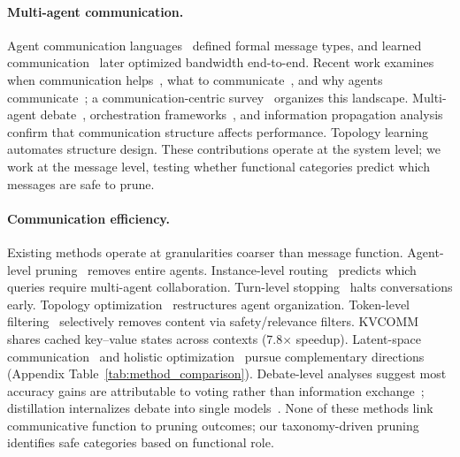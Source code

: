 \paragraph{Multi-agent communication.}
Agent communication languages~\citep{finin_kqml_1994} defined formal message types, and learned communication~\citep{sukhbaatar_commnet_2016, foerster_dial_2016} later optimized bandwidth end-to-end. Recent work examines when communication helps~\citep{rizvi_martel_communication_2026}, what to communicate~\citep{chen_five_ws_2026}, and why agents communicate~\citep{zhou_why_agents_communicate_2025}; a communication-centric survey~\citep{yan_beyond_self_talk_2025} organizes this landscape. Multi-agent debate~\citep{du_debate_2024}, orchestration frameworks~\citep{li_camel_2023, hong_metagpt_2024, wu_autogen_2024, chen_agentverse_2024, wang_megaagent_2025}, and information propagation analysis~\citep{shen_eib_2025} confirm that communication structure affects performance. Topology learning~\citep{li_arg_designer_2026, lu_dytopo_2026} automates structure design. These contributions operate at the system level; we work at the message level, testing whether functional categories predict which messages are safe to prune.

\paragraph{Communication efficiency.}
Existing methods operate at granularities coarser than message function. Agent-level pruning~\citep{wang_agentdropout_2025, wang_agentdropout_v2_2026, li_agp_2025, xiao_agentdiet_2026} removes entire agents. Instance-level routing~\citep{wang_dagp_2025, fan_imad_2026} predicts which queries require multi-agent collaboration. Turn-level stopping~\citep{zeng_s2mad_2025} halts conversations early. Topology optimization~\citep{chen_optima_2025, chen_goagent_2026, wang_anymac_2025, li_lacp_2025} restructures agent organization. Token-level filtering~\citep{safesieve_2025, lin_supervisoragent_2026} selectively removes content via safety/relevance filters. KVCOMM~\citep{ye_kvcomm_2025} shares cached key--value states across contexts (7.8$\times$ speedup). Latent-space communication~\citep{zou_latentmas_2025, du_interlat_2025} and holistic optimization~\citep{li_omac_2025, jiang_agentcomm_2026} pursue complementary directions (Appendix Table~\ref{tab:method_comparison}). Debate-level analyses suggest most accuracy gains are attributable to voting rather than information exchange~\citep{choi_debate_or_vote_2025, wu_can_agents_debate_2025}; distillation internalizes debate into single models~\citep{yi_latent_agents_2026}. None of these methods link communicative function to pruning outcomes; our taxonomy-driven pruning identifies safe categories based on functional role.

